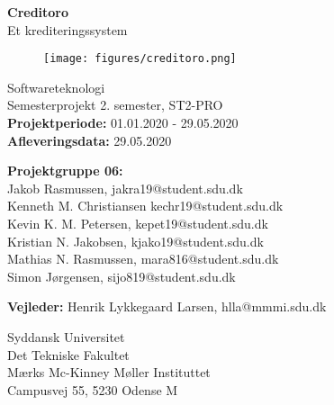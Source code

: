 \begin{titlepage}
\begin{center}
{ \LARGE \bfseries Creditoro \\[0.4cm]}
Et krediteringssystem
\begin{figure}[H]
\centering 
\texttt{[image: figures/creditoro.png]}
\end{figure}

Softwareteknologi\\
\vspace{2mm}
Semesterprojekt 2. semester, ST2-PRO\\
\vspace{2mm}
\textbf{Projektperiode:} 01.01.2020 - 29.05.2020 \\
\vspace{2mm}
\textbf{Afleveringsdata:} 29.05.2020 \\

\vspace{7mm}

\textbf{Projektgruppe 06:} \\
\vspace{2mm}
Jakob Rasmussen, jakra19@student.sdu.dk \\
\vspace{2mm}
Kenneth M. Christiansen kechr19@student.sdu.dk \\
\vspace{2mm}
Kevin K. M. Petersen, kepet19@student.sdu.dk \\
\vspace{2mm}
Kristian N. Jakobsen, kjako19@student.sdu.dk \\
\vspace{2mm}
Mathias N. Rasmussen, mara816@student.sdu.dk \\
\vspace{2mm}
Simon Jørgensen, sijo819@student.sdu.dk \\

\vspace{7mm}

\textbf{Vejleder:} Henrik Lykkegaard Larsen, hlla@mmmi.sdu.dk \\

\vfill

Syddansk Universitet\\
Det Tekniske Fakultet\\
Mærks Mc-Kinney Møller Instituttet\\
Campusvej 55, 5230 Odense M

\end{center}
\end{titlepage}
